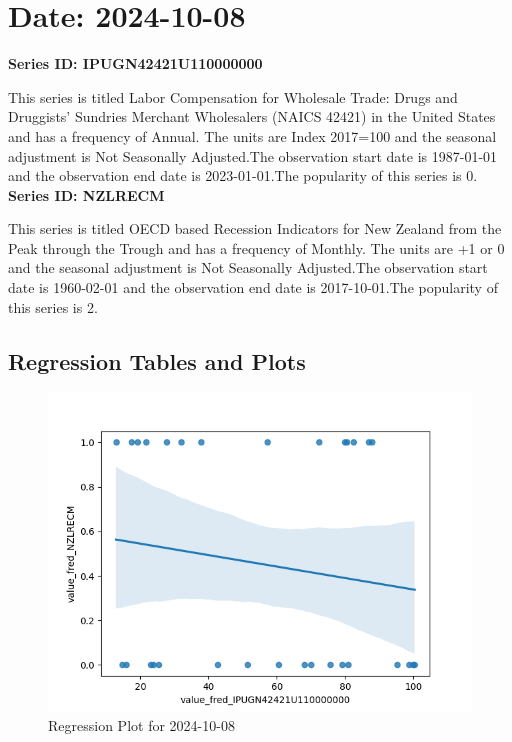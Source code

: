 \section{Date: 2024-10-08}
\noindent \textbf{Series ID: IPUGN42421U110000000} 

\noindent This series is titled Labor Compensation for Wholesale Trade: Drugs and Druggists' Sundries Merchant Wholesalers (NAICS 42421) in the United States and has a frequency of Annual. The units are Index 2017=100 and the seasonal adjustment is Not Seasonally Adjusted.The observation start date is 1987-01-01 and the observation end date is 2023-01-01.The popularity of this series is 0. \\ 

\noindent \textbf{Series ID: NZLRECM} 

\noindent This series is titled OECD based Recession Indicators for New Zealand from the Peak through the Trough and has a frequency of Monthly. The units are +1 or 0 and the seasonal adjustment is Not Seasonally Adjusted.The observation start date is 1960-02-01 and the observation end date is 2017-10-01.The popularity of this series is 2. \\ 

\subsection{Regression Tables and Plots}


\begin{figure}
\centering
\includegraphics[scale = 0.9]{plots/plot_2024-10-08.png}
\caption{Regression Plot for 2024-10-08}
\end{figure}
\newpage
